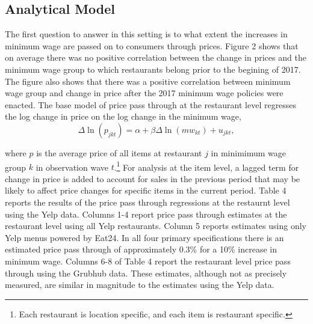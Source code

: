 \documentclass[11pt]{article}
\begin{document}


\subsection{Analytical Model}

The first question to answer in this setting is to what extent the increases in minimum wage are passed on to consumers through prices. Figure 2 shows that on average there was no positive correlation between the change in prices and the minimum wage group to which restaurants belong prior to the begining of 2017. The figure also shows that there was a positive correlation between minimum wage group and change in price after the 2017 minimum wage policies were enacted. The base model of price pass through at the restaurant level regresses the log change in price on the log change in the minimum wage,
\begin{dmath}
\Delta \ln (p_{jkt}) =  \alpha + \beta\Delta \ln (mw_{kt}) + u_{jkt},
\end{dmath}

\noindent where $p$ is the average price of all items at restaurant $j$ in minimimum wage group $k$ in observation wave $t$.\footnote{Each restaurant is location specific, and each item is restaurant specific.} For analysis at the item level, a lagged term for change in price is added to account for sales in the previous period that may be likely to affect price changes for specific items in the current period. Table 4 reports the results of the price pass through regressions at the restaurnt level using the Yelp data. Columns 1-4 report price pass through estimates at the restaurant level using all Yelp restaurants. Column 5 reports estimates using only Yelp menus powered by Eat24. In all four primary specifications there is an estimated price pass through of approximately 0.3\% for a 10\% increase in minimum wage. Columns 6-8 of Table 4 report the restaurant level price pass through using the Grubhub data. These estimates, although not as precisely measured, are similar in magnitude to the estimates using the Yelp data. 
\end{document}

